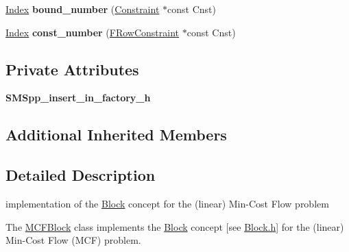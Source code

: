\begin{DoxyCompactItemize}
\item 
\mbox{\label{class_s_m_spp__di__unipi__it_1_1_m_c_f_block_a07e08b9ffeca3678d2d363fa4b09d176}} 
\mbox{\hyperlink{class_s_m_spp__di__unipi__it_1_1_m_c_f_block_ad53d6229d7ec28555a9c9c2fd9abf773}{Index}} {\bfseries bound\+\_\+number} (\mbox{\hyperlink{class_s_m_spp__di__unipi__it_1_1_constraint}{Constraint}} $\ast$const Cnst)
\item 
\mbox{\label{class_s_m_spp__di__unipi__it_1_1_m_c_f_block_a719794ad0d9277d2f504d49fa61967fe}} 
\mbox{\hyperlink{class_s_m_spp__di__unipi__it_1_1_m_c_f_block_ad53d6229d7ec28555a9c9c2fd9abf773}{Index}} {\bfseries const\+\_\+number} (\mbox{\hyperlink{class_s_m_spp__di__unipi__it_1_1_f_row_constraint}{F\+Row\+Constraint}} $\ast$const Cnst)
\end{DoxyCompactItemize}
\subsection*{Private Attributes}
\begin{DoxyCompactItemize}
\item 
\mbox{\label{class_s_m_spp__di__unipi__it_1_1_m_c_f_block_a5618a1c2a09ff7cd62e4de9df7956672}} 
{\bfseries S\+M\+Spp\+\_\+insert\+\_\+in\+\_\+factory\+\_\+h}
\end{DoxyCompactItemize}
\subsection*{Additional Inherited Members}


\subsection{Detailed Description}
implementation of the \mbox{\hyperlink{class_s_m_spp__di__unipi__it_1_1_block}{Block}} concept for the (linear) Min-\/\+Cost Flow problem 

The \mbox{\hyperlink{class_s_m_spp__di__unipi__it_1_1_m_c_f_block}{M\+C\+F\+Block}} class implements the \mbox{\hyperlink{class_s_m_spp__di__unipi__it_1_1_block}{Block}} concept \mbox{[}see \mbox{\hyperlink{_block_8h}{Block.\+h}}\mbox{]} for the (linear) Min-\/\+Cost Flow (M\+CF) problem.

